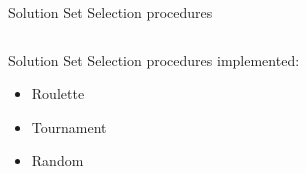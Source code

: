 \documentclass[12pt]{beamer}
\begin{document}
  \begin{frame}[fragile]{Solution Set Selection procedures}
    \begin{columns}
      \begin{column}{0.5\textwidth}
        Solution Set Selection procedures implemented:
        \begin{itemize}
          \item<1> Roulette
          \item<2> Tournament
          \item<3> Random
        \end{itemize}
      \end{column}
      \begin{column}{0.5\textwidth}
\end{column}
\end{columns}
\end{frame}
\end{document}

